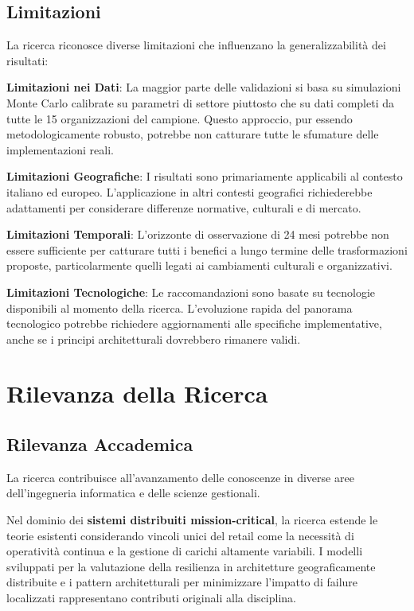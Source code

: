 \begin{bibunit}[IEEEtran]
\subsection{Limitazioni}

La ricerca riconosce diverse limitazioni che influenzano la generalizzabilità dei risultati:

\textbf{Limitazioni nei Dati}: La maggior parte delle validazioni si basa su simulazioni Monte Carlo calibrate su parametri di settore piuttosto che su dati completi da tutte le 15 organizzazioni del campione. Questo approccio, pur essendo metodologicamente robusto, potrebbe non catturare tutte le sfumature delle implementazioni reali.

\textbf{Limitazioni Geografiche}: I risultati sono primariamente applicabili al contesto italiano ed europeo. L'applicazione in altri contesti geografici richiederebbe adattamenti per considerare differenze normative, culturali e di mercato.

\textbf{Limitazioni Temporali}: L'orizzonte di osservazione di 24 mesi potrebbe non essere sufficiente per catturare tutti i benefici a lungo termine delle trasformazioni proposte, particolarmente quelli legati ai cambiamenti culturali e organizzativi.

\textbf{Limitazioni Tecnologiche}: Le raccomandazioni sono basate su tecnologie disponibili al momento della ricerca. L'evoluzione rapida del panorama tecnologico potrebbe richiedere aggiornamenti alle specifiche implementative, anche se i principi architetturali dovrebbero rimanere validi.

\section{Rilevanza della Ricerca}

\subsection{Rilevanza Accademica}

La ricerca contribuisce all'avanzamento delle conoscenze in diverse aree dell'ingegneria informatica e delle scienze gestionali.

Nel dominio dei \textbf{sistemi distribuiti mission-critical}, la ricerca estende le teorie esistenti considerando vincoli unici del retail come la necessità di operatività continua e la gestione di carichi altamente variabili. I modelli sviluppati per la valutazione della resilienza in architetture geograficamente distribuite e i pattern architetturali per minimizzare l'impatto di failure localizzati rappresentano contributi originali alla disciplina.


\end{bibunit}

